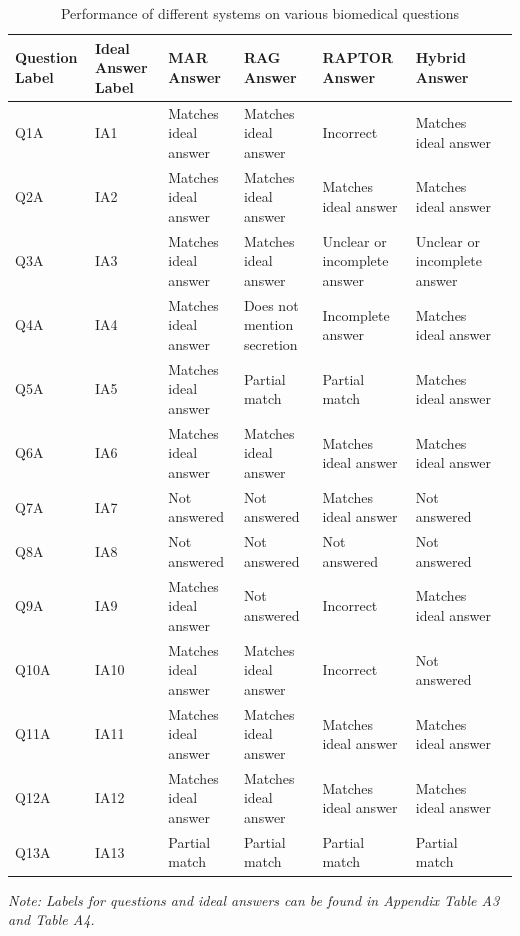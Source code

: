\documentclass[pdflatex,sn-mathphys-num]{sn-jnl}%
\begin{document}
\begin{appendices}
\begin{table}
\caption{Performance of different systems on various biomedical questions}\label{tab:performance}
\begin{tabular*}{\textheight}{@{\extracolsep\fill}p{2cm}p{2cm}p{4cm}p{3cm}p{3cm}p{3cm}p{3cm}}
\toprule
\textbf{Question Label} & \textbf{Ideal Answer Label} & \textbf{MAR Answer} & \textbf{RAG Answer} & \textbf{RAPTOR Answer} & \textbf{Hybrid Answer} \\
\midrule
Q1A & IA1 & Matches ideal answer & Matches ideal answer & Incorrect & Matches ideal answer \\
Q2A & IA2 & Matches ideal answer & Matches ideal answer & Matches ideal answer & Matches ideal answer \\
Q3A & IA3 & Matches ideal answer & Matches ideal answer & Unclear or incomplete answer & Unclear or incomplete answer \\
Q4A & IA4 & Matches ideal answer & Does not mention secretion & Incomplete answer & Matches ideal answer \\
Q5A & IA5 & Matches ideal answer & Partial match & Partial match & Matches ideal answer \\
Q6A & IA6 & Matches ideal answer & Matches ideal answer & Matches ideal answer & Matches ideal answer \\
Q7A & IA7 & Not answered & Not answered & Matches ideal answer & Not answered \\
Q8A & IA8 & Not answered & Not answered & Not answered & Not answered \\
Q9A & IA9 & Matches ideal answer & Not answered & Incorrect & Matches ideal answer \\
Q10A & IA10 & Matches ideal answer & Matches ideal answer & Incorrect & Not answered \\
Q11A & IA11 & Matches ideal answer & Matches ideal answer & Matches ideal answer & Matches ideal answer \\
Q12A & IA12 & Matches ideal answer & Matches ideal answer & Matches ideal answer & Matches ideal answer \\
Q13A & IA13 & Partial match & Partial match & Partial match & Partial match \\
\bottomrule
\end{tabular*}
\par \textit{Note: Labels for questions and ideal answers can be found in Appendix Table A3 and Table A4.}
\end{table}





\end{appendices}
\end{document}
